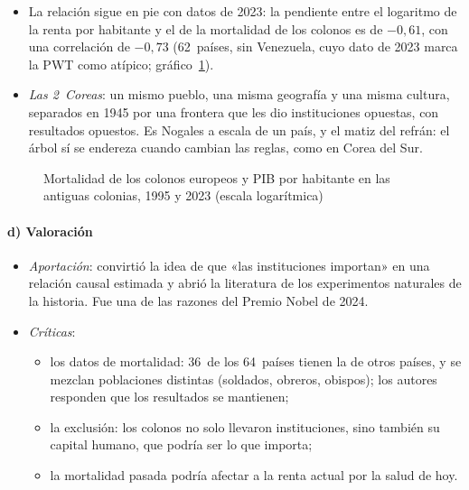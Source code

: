 \documentclass[11pt]{article}
\begin{document}
\begin{itemize}
\item La relación sigue en pie con datos de 2023: la pendiente entre el logaritmo de la renta por habitante y el de la mortalidad de los colonos es de $-0{,}61$, con una correlación de $-0{,}73$ (62~países, sin Venezuela, cuyo dato de 2023 marca la PWT como atípico; gráfico~\ref{fig:ajr-mortalidad})\nocite{GGDC2025PWT}.
\item \emph{Las 2~Coreas}: un mismo pueblo, una misma geografía y una misma cultura, separados en 1945 por una frontera que les dio instituciones opuestas, con resultados opuestos\nocite{AcemogluRobinson2012}. Es Nogales a escala de un país, y el matiz del refrán: el árbol sí se endereza cuando cambian las reglas, como en Corea del Sur.
\end{itemize}

\begin{figure}[H]
\centering
\caption{Mortalidad de los colonos europeos y PIB por habitante en las antiguas colonias, 1995 y 2023 (escala logarítmica)}\label{fig:ajr-mortalidad}
\end{figure}

\paragraph{d) Valoración}

\begin{itemize}
\item \emph{Aportación}: convirtió la idea de que «las instituciones importan» en una relación causal estimada y abrió la literatura de los experimentos naturales de la historia. Fue una de las razones del Premio Nobel de 2024\nocite{NobelPrize2024}.
\item \emph{Críticas}:
  \begin{itemize}
  \item los datos de mortalidad: 36~de los 64~países tienen la de otros países, y se mezclan poblaciones distintas (soldados, obreros, obispos)\nocite{Albouy2012}; los autores responden que los resultados se mantienen\nocite{AcemogluJohnsonRobinson2012Reply};
  \item la exclusión: los colonos no solo llevaron instituciones, sino también su capital humano, que podría ser lo que importa\nocite{Glaeser2004};
  \item la mortalidad pasada podría afectar a la renta actual por la salud de hoy.
  \end{itemize}
\end{itemize}
\end{document}
